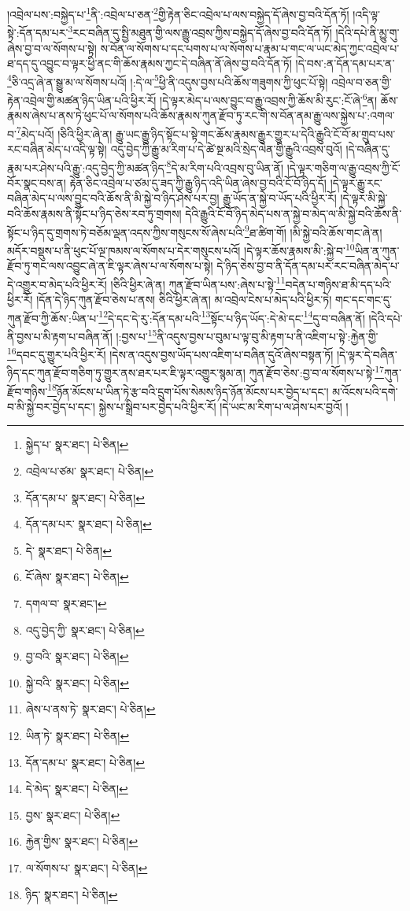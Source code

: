 །འབྲེལ་པས་:བསྐྱེད་པ་\footnote{སྐྱེད་པ་  སྣར་ཐང་།  པེ་ཅིན། }ནི་:འབྲེལ་པ་ཅན་\footnote{འབྲེལ་པ་ཙམ་  སྣར་ཐང་།  པེ་ཅིན། }གྱི་རྟེན་ཅིང་འབྲེལ་པ་ལས་བསྐྱེད་དོ་ཞེས་བྱ་བའི་དོན་ཏོ། །འདི་ལྟ་སྟེ་:དོན་དམ་པར་\footnote{དོན་དམ་པ་  སྣར་ཐང་།  པེ་ཅིན། }རང་བཞིན་དུ་སྤྱི་མཐུན་གྱི་ལས་རྒྱུ་འབྲས་ཀྱིས་བསྐྱེད་དོ་ཞེས་བྱ་བའི་དོན་ཏོ། །དེའི་དཔེ་ནི་མྱུ་གུ་ཞེས་བྱ་བ་ལ་སོགས་པ་སྟེ། ས་བོན་ལ་སོགས་པ་དང་པགས་པ་ལ་སོགས་པ་རྣམ་པ་གང་ལ་ཡང་མེད་ཀྱང་འབྲེལ་པ་ཐ་དད་དུ་འབྱུང་བ་ལྟར་ཕྱི་ནང་གི་ཆོས་རྣམས་ཀྱང་དེ་བཞིན་ནོ་ཞེས་བྱ་བའི་དོན་ཏོ། །དེ་བས་:ན་དོན་དམ་པར་ན་\footnote{དོན་དམ་པར་  སྣར་ཐང་།  པེ་ཅིན། }ཅི་འདྲ་ཞེ་ན་སྒྱུ་མ་ལ་སོགས་པའོ། །:དེ་ལ་\footnote{དེ་  སྣར་ཐང་།  པེ་ཅིན། }ཕྱི་ནི་འདུས་བྱས་པའི་ཆོས་གཟུགས་ཀྱི་ཕུང་པོ་སྟེ། འབྲེལ་བ་ཅན་གྱི་རྟེན་འབྲེལ་གྱི་མཚན་ཉིད་ཡིན་པའི་ཕྱིར་རོ། །དེ་ལྟར་མེད་པ་ལས་བྱུང་བ་རྒྱུ་འབྲས་ཀྱི་ཆོས་མི་རུང་:ངོ་ཞེ་\footnote{ངོ་ཞེས་  སྣར་ཐང་།  པེ་ཅིན། }ན། ཆོས་རྣམས་ཞེས་པ་ནས་ཏེ་ཕུང་པོ་ལ་སོགས་པའི་ཆོས་རྣམས་ཀུན་རྫོབ་ཏུ་རང་གི་ས་བོན་ནམ་རྒྱུ་ལས་སྐྱེས་པ་:འགལ་བ་\footnote{དགལ་བ་  སྣར་ཐང་། }མེད་པའོ། །ཅིའི་ཕྱིར་ཞེ་ན། རྒྱུ་ཡང་རྒྱུ་ཉིད་སྟོང་པ་སྟེ་གང་ཆོས་རྣམས་རྒྱུར་གྱུར་པ་དེའི་རྒྱུའི་ངོ་བོ་མ་གྲུབ་པས་རང་བཞིན་མེད་པ་འདི་ལྟ་སྟེ། འདུ་བྱེད་ཀྱི་རྒྱུ་མ་རིག་པ་དེ་ཚེ་སྔ་མའི་སྲེད་ལེན་གྱི་རྒྱུའི་འབྲས་བུའོ། །དེ་བཞིན་དུ་རྣམ་པར་ཤེས་པའི་རྒྱུ་:འདུ་བྱེད་ཀྱི་མཚན་ཉིད་\footnote{འདུ་བྱེད་ཀྱི་  སྣར་ཐང་།  པེ་ཅིན། }དེ་མ་རིག་པའི་འབྲས་བུ་ཡིན་ནོ། །དེ་ལྟར་གཅིག་ལ་རྒྱུ་འབྲས་ཀྱི་ངོ་བོར་སྣང་བས་ན། རྟེན་ཅིང་འབྲེལ་པ་ཙམ་དུ་ཟད་ཀྱི་རྒྱུ་ཉིད་འདི་ཡིན་ཞེས་བྱ་བའི་ངོ་བོ་ཉིད་དོ། །དེ་ལྟར་རྒྱུ་རང་བཞིན་མེད་པ་ལས་བྱུང་བའི་ཆོས་ནི་མི་སྐྱེ་བ་ཉིད་ཤེས་པར་བྱ། རྒྱུ་ཡོད་ན་སྐྱེ་བ་ཡོད་པའི་ཕྱིར་རོ། །དེ་ལྟར་མི་སྐྱེ་བའི་ཆོས་རྣམས་ནི་སྟོང་པ་ཉིད་ཅེས་རབ་ཏུ་གྲགས། དེའི་རྒྱུའི་ངོ་བོ་ཉིད་མེད་པས་ན་སྐྱེ་བ་མེད་ལ་མི་སྐྱེ་བའི་ཆོས་ནི་སྟོང་པ་ཉིད་དུ་གྲགས་ཏེ་བཅོམ་ལྡན་འདས་ཀྱིས་གསུངས་སོ་ཞེས་པའི་\footnote{བྱ་བའི་  སྣར་ཐང་།  པེ་ཅིན། }ཐ་ཚིག་གོ། །མི་སྐྱེ་བའི་ཆོས་གང་ཞེ་ན། མདོར་བསྡུས་པ་ནི་ཕུང་པོ་ལྔ་ཁམས་ལ་སོགས་པ་དེར་གསུངས་པའོ། །དེ་ལྟར་ཆོས་རྣམས་མི་:སྐྱེ་བ་\footnote{སྐྱེ་བའི་  སྣར་ཐང་།  པེ་ཅིན། }ཡིན་ན་ཀུན་རྫོབ་ཏུ་གང་ལས་འབྱུང་ཞེ་ན་ཇི་ལྟར་ཞེས་པ་ལ་སོགས་པ་སྟེ། དེ་ཉིད་ཅེས་བྱ་བ་ནི་དོན་དམ་པར་རང་བཞིན་མེད་པ་དེ་འགྱུར་བ་མེད་པའི་ཕྱིར་རོ། །ཅིའི་ཕྱིར་ཞེ་ན། ཀུན་རྫོབ་ཡིན་པས་:ཞེས་པ་སྟེ་\footnote{ཞེས་པ་ནས་ཏེ་  སྣར་ཐང་།  པེ་ཅིན། }བདེན་པ་གཉིས་ཐ་མི་དད་པའི་ཕྱིར་རོ། །དོན་དེ་ཉིད་ཀུན་རྫོབ་ཅེས་པ་ནས། ཅིའི་ཕྱིར་ཞེ་ན། མ་འབྲེལ་ངེས་པ་མེད་པའི་ཕྱིར་ཏེ། གང་དང་གང་དུ་ཀུན་རྫོབ་ཀྱི་ཆོས་:ཡིན་པ་\footnote{ཡིན་ཏེ་  སྣར་ཐང་།  པེ་ཅིན། }དེ་དང་དེ་རུ་:དོན་དམ་པའི་\footnote{དོན་དམ་པ་  སྣར་ཐང་།  པེ་ཅིན། }སྟོང་པ་ཉིད་ཡོད་:དེ་མེ་དང་\footnote{དེ་མེད་  སྣར་ཐང་།  པེ་ཅིན། }དུ་བ་བཞིན་ནོ། །དེའི་དཔེ་ནི་བྱས་པ་མི་རྟག་པ་བཞིན་ནོ། །:བྱས་པ་\footnote{བྱས་  སྣར་ཐང་།  པེ་ཅིན། }ནི་འདུས་བྱས་པ་བུམ་པ་ལྟ་བུ་མི་རྟག་པ་ནི་འཇིག་པ་སྟེ་:རྐྱེན་གྱི་\footnote{རྐྱེན་གྱིས་  སྣར་ཐང་།  པེ་ཅིན། }དབང་དུ་གྱུར་པའི་ཕྱིར་རོ། །དེས་ན་འདུས་བྱས་ཡོད་པས་འཇིག་པ་བཞིན་དུའོ་ཞེས་བསྟན་ཏོ། །དེ་ལྟར་དེ་བཞིན་ཉིད་དང་ཀུན་རྫོབ་གཅིག་ཏུ་གྱུར་ནས་ཐར་པར་ཇི་ལྟར་འགྱུར་སྙམ་ན། ཀུན་རྫོབ་ཅེས་:བྱ་བ་ལ་སོགས་པ་སྟེ་\footnote{ལ་སོགས་པ་  སྣར་ཐང་།  པེ་ཅིན། }ཀུན་རྫོབ་གཉིས་\footnote{ཉིད་  སྣར་ཐང་།  པེ་ཅིན། }ཉོན་མོངས་པ་ཡིན་ཏེ་རྩ་བའི་དྲུག་པོས་སེམས་ཉིད་ཉོན་མོངས་པར་བྱེད་པ་དང་། མ་འོངས་པའི་དགེ་བ་མི་སྐྱེ་བར་བྱེད་པ་དང་། སྐྱེས་པ་སྒྲིབ་པར་བྱེད་པའི་ཕྱིར་རོ། །དེ་ཡང་མ་རིག་པ་ལ་ཤེས་པར་བྱའོ། །
